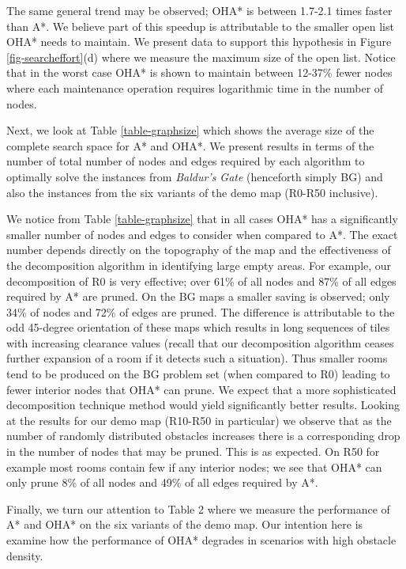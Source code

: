 The same general trend may be observed; OHA* is between 1.7-2.1 times faster than A*.
We believe part of this speedup is attributable to the smaller open list OHA* needs to maintain.
We present data to support this hypothesis in Figure \ref{fig-searcheffort}(d) where we measure 
the maximum size of the open list. 
Notice that in the worst case OHA* is shown to maintain between 12-37\% fewer nodes where each
maintenance operation requires logarithmic time in the number of nodes.
\par
Next, we look at Table \ref{table-graphsize} which shows the average size of the complete search
space for A* and OHA*.
We present results in terms of the number of total number of nodes and edges required by each algorithm
to optimally solve the instances from \emph{Baldur's Gate} (henceforth simply BG) and also 
the instances from the six variants of the demo map (R0-R50 inclusive).

We notice from Table \ref{table-graphsize} that in all cases OHA* has a significantly smaller number 
of nodes and edges to consider when compared to A*.
The exact number depends directly on the topography of the map and the 
effectiveness of the decomposition algorithm in identifying large empty areas.
For example, our decomposition of R0 is very effective; over 61\% of all nodes and 87\% of all 
edges required by A* are pruned.
On the BG maps a smaller saving is observed; only 34\% of nodes and 72\% of edges are pruned.
The difference is attributable to the odd 45-degree orientation of these maps which results in 
long sequences of tiles with increasing clearance values 
(recall that our decomposition algorithm ceases further expansion of a room if it detects 
such a situation).
Thus smaller rooms tend to be produced on the BG problem set (when compared to R0) leading to 
fewer interior nodes that OHA* can prune. 
We expect that a more sophisticated decomposition technique method would yield significantly 
better results.
Looking at the results for our demo map (R10-R50 in particular) we observe that as the number of 
randomly distributed obstacles increases there is a corresponding drop in the number of nodes that may be 
pruned.
This is as expected. 
On R50 for example most rooms contain few if any interior nodes; 
we see that OHA* can only prune 8\% of all nodes and 49\% of all edges required by A*.
\par
Finally, we turn our attention to Table 2 where we measure the 
performance of A* and OHA* on the six variants of the demo map.
Our intention here is examine how the performance of OHA* degrades in scenarios with
high obstacle density.

